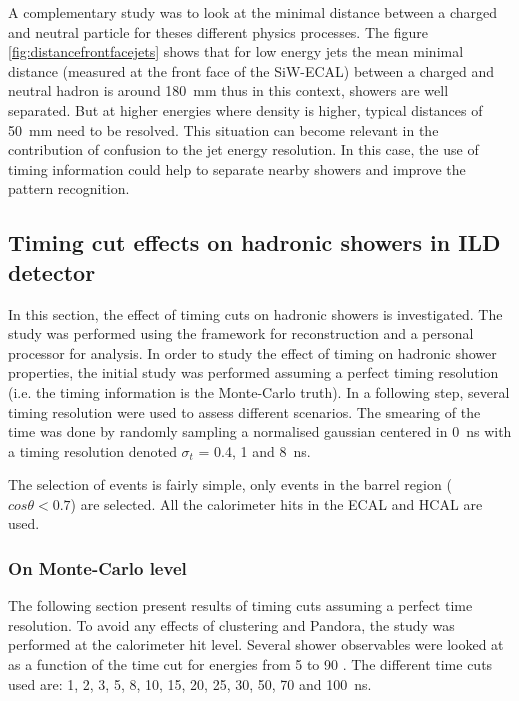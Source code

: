 A complementary study was to look at the minimal distance between a charged and neutral particle for theses different physics processes. The figure \ref{fig:distancefrontfacejets} shows that for low energy jets the mean minimal distance (measured at the front face of the SiW-ECAL) between a charged and neutral hadron is around \SI{180}{\milli\meter} thus in this context, showers are well separated. But at higher energies where density is higher, typical distances of \SI{50}{\milli\meter} need to be resolved. This situation can become relevant in the contribution of confusion to the jet energy resolution. In this case, the use of timing information could help to separate nearby showers and improve the pattern recognition.

\subsection{Timing cut effects on hadronic showers in ILD detector}

In this section, the effect of timing cuts on hadronic showers is investigated. The study was performed using the \ilcsoft framework for reconstruction and a personal \marlin processor for analysis. In order to study the effect of timing on hadronic shower properties, the initial study was performed assuming a perfect timing resolution (i.e. the timing information is the Monte-Carlo truth). In a following step, several timing resolution were used to assess different scenarios. The smearing of the time was done by randomly sampling a normalised gaussian centered in \SI{0}{\nano\second} with a timing resolution denoted $\sigma_{t}$ = 0.4, 1 and \SI{8}{\nano\second}.

The selection of events is fairly simple, only events in the barrel region ($cos\theta < 0.7$) are selected. All the calorimeter hits in the ECAL and HCAL are used.

\subsubsection{On Monte-Carlo level}

The following section present results of timing cuts assuming a perfect time resolution. To avoid any effects of clustering and Pandora, the study was performed at the calorimeter hit level. Several shower observables were looked at as a function of the time cut for energies from 5 \GeV to 90 \GeV \kzeroL. The different time cuts used are: 1, 2, 3, 5, 8, 10, 15, 20, 25, 30, 50, 70 and \SI{100}{\nano\second}.

